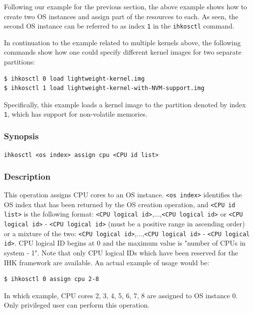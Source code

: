 \documentclass[twoside,11pt,fleqn]{book}
\begin{document}
{Following our example for the previous section, the above example shows
how to create two OS instances and assign part of the resources to each.
As seen, the second OS instance can be referred to as index \texttt{1} in
the \texttt{ihkosctl} command.

In continuation to the example related to multiple kernels above, the following
commands show how one could specify different kernel images for two separate
partitions:

\begin{verbatim}
$ ihkosctl 0 load lightweight-kernel.img
$ ihkosctl 1 load lightweight-kernel-with-NVM-support.img
\end{verbatim}

Specifically, this example loads a kernel image to the partition denoted by index
\texttt{1}, which has support for non-volatile memories.
}

\subsubsection{}\label{sec:assign_cpu}
\subsubsection*{Synopsis}{\quad} \texttt{ihkosctl <os index> assign cpu <CPU id list>}
\subsubsection*{Description}{\quad}
This operation assigns CPU cores to an OS instance.
\texttt{<os index>} identifies the OS index
that has been returned by the OS creation operation,
and \texttt{<CPU id list>} is the following format:
\texttt{<CPU logical id>},...,\texttt{<CPU logical id>} or
\texttt{<CPU logical id>} - \texttt{<CPU logical id>}
(must be a positive range in ascending order)
or a mixture of the two: \texttt{<CPU logical id>},...,\texttt{<CPU logical
id>} - \texttt{<CPU logical id>}.
CPU logical ID begins at 0 and the maximum value is "number of CPUs in system - 1".
Note that only CPU logical IDs which have been
reserved for the IHK framework are available.
An actual example of usage would be:

\begin{verbatim}
$ ihkosctl 0 assign cpu 2-8
\end{verbatim}

In which example, CPU cores 2, 3, 4, 5, 6, 7, 8 are assigned to OS instance 0.
Only privileged user can perform this operation.
\end{document}
